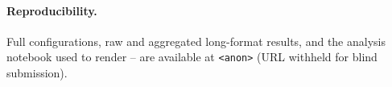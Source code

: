 \paragraph{Reproducibility.} Full configurations, raw and aggregated long-format results, and the analysis notebook used to render -- are available at \texttt{<anon>} (URL withheld for blind submission).




